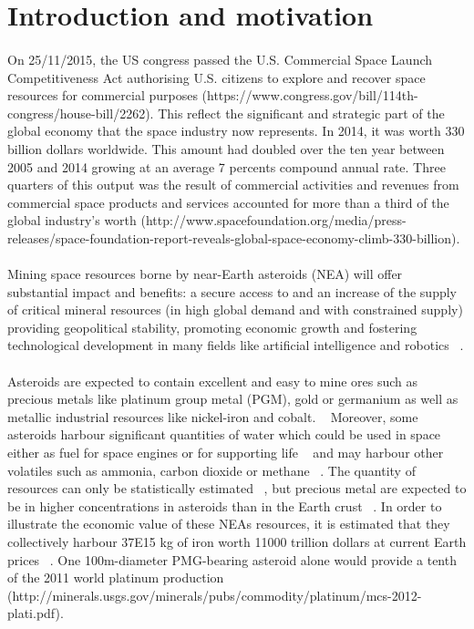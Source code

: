 


\section{Introduction and motivation}
\paragraph{}	On 25/11/2015, the US congress passed the U.S. Commercial Space Launch Competitiveness Act authorising U.S. citizens to explore and recover space resources for  commercial purposes (https://www.congress.gov/bill/114th-congress/house-bill/2262). This reflect the significant and strategic part of the global economy that  the space industry now represents. In 2014, it was worth 330 billion dollars worldwide. This amount had doubled over the ten year between 2005 and 2014 growing at an average 7 percents compound annual rate. Three quarters of this output was the result of commercial activities and revenues from commercial space products and services accounted for more than a third of the global industry's worth (http://www.spacefoundation.org/media/press-releases/space-foundation-report-reveals-global-space-economy-climb-330-billion). 
\paragraph{}	 Mining space resources borne by near-Earth asteroids (NEA) will offer substantial impact and benefits: a secure access to and an increase of the supply of critical mineral resources (in high global demand and with constrained supply) providing geopolitical stability, promoting economic growth and fostering technological development in many fields like artificial intelligence and robotics ~\cite{Sommariva2015}.
\paragraph{}	Asteroids are expected to contain excellent and easy to mine ores such as precious metals like platinum group metal (PGM), gold or germanium as well as metallic industrial resources like nickel-iron and cobalt. ~\cite{Sommariva2015} Moreover, some asteroids harbour significant quantities of water which could be used in space either as fuel for space engines or for supporting life ~\cite{Elvis2014} and may harbour other volatiles such as ammonia, carbon dioxide or methane ~\cite{Sommariva2015}. The quantity of resources can only be statistically estimated ~\cite{Sanchez2012}, but precious metal are expected to be in higher concentrations in asteroids than in the Earth crust ~\cite{Sommariva2015}. In order to illustrate the economic value of these NEAs resources, it is estimated that they collectively harbour 37E15 kg of iron worth 11000 trillion dollars at current Earth prices ~\cite{LewisBook}. One 100m-diameter PMG-bearing asteroid alone would provide a tenth of the 2011 world platinum production (http://minerals.usgs.gov/minerals/pubs/commodity/platinum/mcs-2012-plati.pdf).
